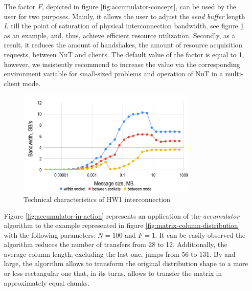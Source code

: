 The factor $F$, depicted in figure \ref{fig:accumulator-concept}, can be used by the user for two purposes. Mainly, it allows the user to adjust the \textit{send buffer} length $L$ till the point of saturation of physical interconnection bandwidth, see figure \ref{fig:hw1-bandwidth} as an example, and, thus, achieve efficient resource utilization. Secondly, as a result, it reduces the amount of handshakes, the amount of resource acquisition requests, between NuT and clients. The default value of the factor is equal to 1, however, we insistently recommend to increase the value via the corresponding environment variable for small-sized problems and operation of NuT in a multi-client mode.\\


\begin{figure}[htpb]
  \centering
  \includegraphics[width=0.8\textwidth]{figures/chapter-3/hw1-bandwidth.png}
  \caption{Technical characteristics of HW1 interconnection} \label{fig:hw1-bandwidth}
\end{figure}



Figure \ref{fig:accumulator-in-action} represents an application of the \textit{accumulator} algorithm to the example represented in figure \ref{fig:matrix-column-distribution} with the following parameters: $N = 100$ and $F = 1$. It can be easily observed the algorithm reduces the number of transfers from 28 to 12. Additionally, the average column length, excluding the last one, jumps from 56 to 131. By and large, the algorithm allows to transform the original distribution shape to a more or less rectangular one that, in its turns, allows to transfer the matrix in approximately equal chunks.\\



